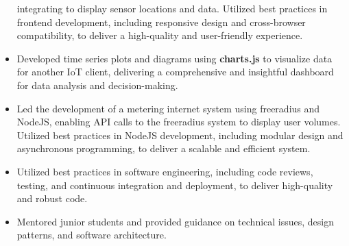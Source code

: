 \begin{itemize}
        integrating  to display sensor locations and data.
        Utilized best practices in frontend development, including responsive design and cross-browser compatibility, to deliver a high-quality and user-friendly experience.
  \item Developed time series plots and diagrams using \textbf{charts.js} to visualize data for another IoT client,
        delivering a comprehensive and insightful dashboard for data analysis and decision-making.
  \item Led the development of a metering internet system using freeradius and NodeJS, enabling API calls to the freeradius system to display user volumes.
        Utilized best practices in NodeJS development, including modular design and asynchronous programming, to deliver a scalable and efficient system.
  \item Utilized best practices in software engineering, including code reviews, testing, and continuous
        integration and deployment, to deliver high-quality and robust code.
  \item Mentored junior students and provided guidance on technical issues,
        design patterns, and software architecture.
\end{itemize}
